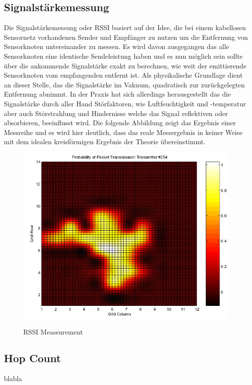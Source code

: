 \subsection{Signalstärkemessung}
Die Signalstärkemessung oder \ac{RSSI} basiert auf der Idee, die bei einem kabellosen Sensornetz vorhandenen Sender und Empfänger zu nutzen um die 
Entfernung von Sensorknoten untereinander zu messen. Es wird davon ausgegangen das alle Sensorknoten eine identische Sendeleistung haben und es nun
möglich sein sollte über die ankommende Signalstärke exakt zu berechnen, wie weit der emittierende Sensorknoten vom empfangenden entfernt ist. Als 
physikalische Grundlage dient an dieser Stelle, das die Signalstärke im Vakuum, quadratisch zur zurückgelegten Entfernung abnimmt. In der Praxis 
hat sich allerdings herausgestellt das die Signalstärke durch aller Hand Störfaktoren, wie Luftfeuchtigkeit und -temperatur aber auch Störstrahlung 
und Hindernisse welche das Signal reflektiven oder absorbieren, beeinflusst wird. Die folgende Abbildung zeigt das Ergebnis einer Messreihe und es 
wird hier deutlich, dass das reale Messergebnis in keiner Weise mit dem idealen kreisförmigen Ergebnis der Theorie übereinstimmt. 

\begin{figure}
  \caption{RSSI Meassurement}
  \includegraphics[scale=0.75]{img/RSSI1}\\
  \cite{whitehouse}
\end{figure}

\subsection{Hop Count}
blabla

